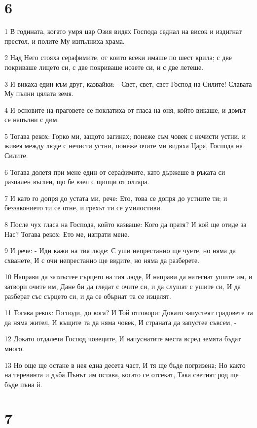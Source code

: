 \chapter{6}

\par 1 В годината, когато умря цар Озия видях Господа седнал на висок и издигнат престол, и полите Му изпълниха храма.
\par 2 Над Него стояха серафимите, от които всеки имаше по шест крила; с две покриваше лицето си, с две покриваше нозете си, и с две летеше.
\par 3 И викаха един към друг, казвайки: - Свет, свет, свет Господ на Силите! Славата Му пълни цялата земя.
\par 4 И основите на праговете се поклатиха от гласа на оня, който викаше, и домът се напълни с дим.
\par 5 Тогава рекох: Горко ми, защото загинах; понеже съм човек с нечисти устни, и живея между люде с нечисти устни, понеже очите ми видяха Царя, Господа на Силите.
\par 6 Тогава долетя при мене един от серафимите, като държеше в ръката си разпален въглен, що бе взел с щипци от олтара.
\par 7 И като го допря до устата ми, рече: Ето, това се допря до устните ти; и беззаконието ти се отне, и грехът ти се умилостиви.
\par 8 После чух гласа на Господа, който казваше: Кого да пратя? И кой ще отиде за Нас? Тогава рекох: Ето ме, изпрати мене.
\par 9 И рече: - Иди кажи на тия люде: С уши непрестанно ще чуете, но няма да схванете, И с очи непрестанно ще видите, но няма да разберете.
\par 10 Направи да затлъстее сърцето на тия люде, И направи да натегнат ушите им, и затвори очите им, Дане би да гледат с очите си, и да слушат с ушите си, И да разберат със сърцето си, и да се обърнат та се изцелят.
\par 11 Тогава рекох: Господи, до кога? И Той отговори: Докато запустеят градовете та да няма жител, И къщите та да няма човек, И страната да запустее съвсем, -
\par 12 Докато отдалечи Господ човеците, И напуснатите места всред земята бъдат много.
\par 13 Но още ще остане в нея една десета част, И тя ще бъде погризена; Но както на теревинта и дъба Пънът им остава, когато се отсекат, Така светият род ще бъде пъна й.

\chapter{7}

